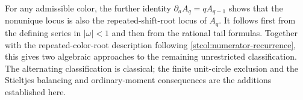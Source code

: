 For any admissible color, the further identity
$\partial_aA_q=qA_{q-1}$ shows that the nonunique locus is also the
repeated-shift-root locus of $A_q$.  It follows first from the defining
series in $|\omega|<1$ and then from the rational tail formulas.
Together with the repeated-color-root description following
\eqref{stcol:numerator-recurrence}, this gives two algebraic approaches
to the remaining unrestricted classification.  The alternating
classification is classical; the finite unit-circle exclusion and the
Stieltjes balancing and ordinary-moment consequences are the additions
established here.
